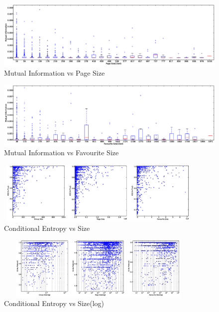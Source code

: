 \begin{figure}
\centering
\includegraphics[scale=0.25]{data/MIvsPageSizeBox.eps}
\caption{Mutual Information vs Page Size}
\label{Fig: Mutual Information vs Page Size}
\end{figure}

\begin{figure}
\centering
\includegraphics[scale=0.25]{data/MIvsFavouritesSizeBox.eps}
\caption{Mutual Information vs Favourite Size}
\label{Fig: Mutual Information vs Favourite Size}
\end{figure}


\begin{figure}
\centering
\includegraphics[width=100mm, height=30mm]{data/CEvsSize.eps}
\caption{Conditional Entropy vs Size}
\label{Fig: Conditional Entropy vs Size}
\end{figure}

\begin{figure}
\centering
\includegraphics[width=100mm, height=30mm]{data/CEvsSizeLog.eps}
\caption{Conditional Entropy vs Size(log)}
\label{Fig: Conditional Entropy vs Size(Log)}
\end{figure}

